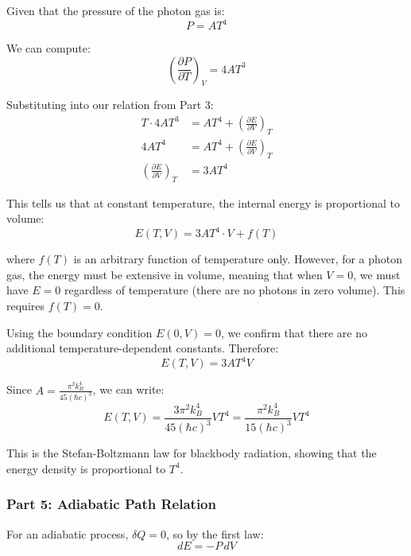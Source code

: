 \documentclass[10pt,twocoloumn]{article}
\begin{document}
Given that the pressure of the photon gas is:
\begin{equation}P = AT^4\end{equation}

We can compute:
\begin{equation}\left(\frac{\partial P}{\partial T}\right)_V = 4AT^3\end{equation}

Substituting into our relation from Part 3:
\begin{align}
    T \cdot 4AT^3 &= AT^4 + \left(\frac{\partial E}{\partial V}\right)_T\\
4AT^4 &= AT^4 + \left(\frac{\partial E}{\partial V}\right)_T\\
\left(\frac{\partial E}{\partial V}\right)_T &= 3AT^4\end{align}

This tells us that at constant temperature, the internal energy is proportional to volume:
\begin{equation}E(T,V) = 3AT^4 \cdot V + f(T)\end{equation}

where $f(T)$ is an arbitrary function of temperature only. However, for a photon gas, the energy must be extensive in volume, meaning that when $V = 0$, we must have $E = 0$ regardless of temperature (there are no photons in zero volume). This requires $f(T) = 0$.

Using the boundary condition $E(0, V) = 0$, we confirm that there are no additional temperature-dependent constants. Therefore:
\begin{equation}\boxed{E(T,V) = 3AT^4 V}\end{equation}

Since $A = \frac{\pi^2 k_B^4}{45(\hbar c)^3}$, we can write:
\begin{equation}E(T,V) = \frac{3\pi^2 k_B^4}{45(\hbar c)^3} VT^4 = \frac{\pi^2 k_B^4}{15(\hbar c)^3} VT^4\end{equation}

This is the Stefan-Boltzmann law for blackbody radiation, showing that the energy density is proportional to $T^4$.

\subsubsection*{Part 5: Adiabatic Path Relation}

For an adiabatic process, $\delta Q = 0$, so by the first law:
\begin{equation}dE = -P \, dV\end{equation}
\end{document}
